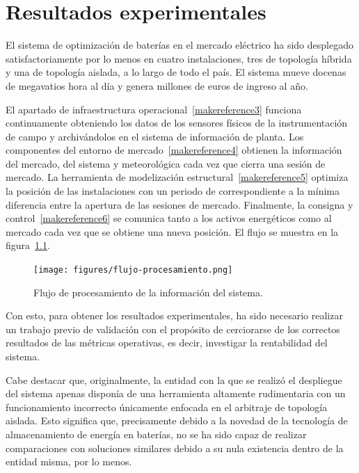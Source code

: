 \cleardoublepage

\chapter{Resultados experimentales}
\label{makereference7}

El sistema de optimización de baterías en el mercado eléctrico ha sido desplegado satisfactoriamente por lo menos en cuatro instalaciones, tres de topología híbrida y una de topología aislada, a lo largo de todo el país. El sistema mueve docenas de megavatios hora al día y genera millones de euros de ingreso al año.

El apartado de infraestructura operacional~\ref{makereference3} funciona continuamente obteniendo los datos de los sensores físicos de la instrumentación de campo y archivándolos en el sistema de información de planta. Los componentes del entorno de mercado~\ref{makereference4} obtienen la información del mercado, del sistema y meteorológica cada vez que cierra una sesión de mercado. La herramienta de modelización estructural~\ref{makereference5} optimiza la posición de las instalaciones con un periodo de correspondiente a la mínima diferencia entre la apertura de las sesiones de mercado. Finalmente, la consigna y control~\ref{makereference6} se comunica tanto a los activos energéticos como al mercado cada vez que se obtiene una nueva posición. El flujo se muestra en la figura~\ref{fig:flujo-procesamiento}.

\begin{figure}
  \centering
  \texttt{[image: figures/flujo-procesamiento.png]}
  \caption[Flujo de procesamiento de la información del sistema.]{Flujo de procesamiento de la información del sistema.}
  \label{fig:flujo-procesamiento}
\end{figure}

Con esto, para obtener los resultados experimentales, ha sido necesario realizar un trabajo previo de validación con el propósito de cerciorarse de los correctos resultados de las métricas operativas, es decir, investigar la rentabilidad del sistema.

Cabe destacar que, originalmente, la entidad con la que se realizó el despliegue del sistema apenas disponía de una herramienta altamente rudimentaria con un funcionamiento incorrecto únicamente enfocada en el arbitraje de topología aislada. Esto significa que, precisamente debido a la novedad de la tecnología de almacenamiento de energía en baterías, no se ha sido capaz de realizar comparaciones con soluciones similares debido a su nula existencia dentro de la entidad misma, por lo menos.

